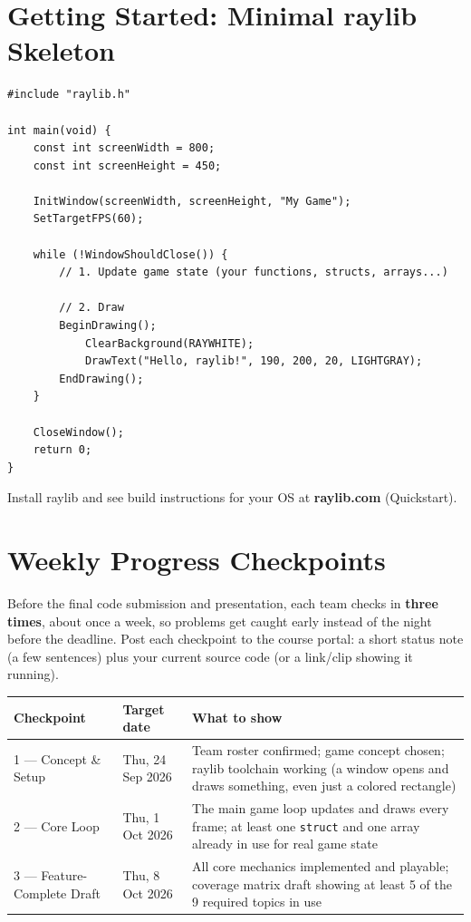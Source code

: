 \documentclass[11pt]{article}
\begin{document}
\section*{Getting Started: Minimal raylib Skeleton}

\begin{lstlisting}
#include "raylib.h"

int main(void) {
    const int screenWidth = 800;
    const int screenHeight = 450;

    InitWindow(screenWidth, screenHeight, "My Game");
    SetTargetFPS(60);

    while (!WindowShouldClose()) {
        // 1. Update game state (your functions, structs, arrays...)

        // 2. Draw
        BeginDrawing();
            ClearBackground(RAYWHITE);
            DrawText("Hello, raylib!", 190, 200, 20, LIGHTGRAY);
        EndDrawing();
    }

    CloseWindow();
    return 0;
}
\end{lstlisting}

Install raylib and see build instructions for your OS at \textbf{raylib.com} (Quickstart).

\section*{Weekly Progress Checkpoints}

Before the final code submission and presentation, each team checks in \textbf{three times},
about once a week, so problems get caught early instead of the night before the deadline.
Post each checkpoint to the course portal: a short status note (a few sentences) plus your
current source code (or a link/clip showing it running).

\begin{center}
\begin{tabular}{@{}lp{2.6cm}p{8.3cm}@{}}
\toprule
Checkpoint & Target date & What to show \\
\midrule
1 --- Concept \& Setup & Thu, 24 Sep 2026 & Team roster confirmed; game concept chosen; raylib
toolchain working (a window opens and draws something, even just a colored rectangle) \\
2 --- Core Loop & Thu, 1 Oct 2026 & The main game loop updates and draws every frame; at least
one \texttt{struct} and one array already in use for real game state \\
3 --- Feature-Complete Draft & Thu, 8 Oct 2026 & All core mechanics implemented and playable;
coverage matrix draft showing at least 5 of the 9 required topics in use \\
\bottomrule
\end{tabular}
\end{center}
\end{document}
